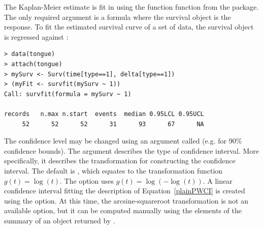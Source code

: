 \documentclass[article]{jss}
\begin{document}
The Kaplan-Meier estimate is fit in  using the function  function from the  package. The only required argument is a formula where the survival object is the response. To fit the estimated survival curve of a set of data, the survival object is regressed against :
\begin{verbatim}
> data(tongue)
> attach(tongue)
> mySurv <- Surv(time[type==1], delta[type==1])
> (myFit <- survfit(mySurv ~ 1))
Call: survfit(formula = mySurv ~ 1)

records   n.max n.start  events  median 0.95LCL 0.95UCL 
     52      52      52      31      93      67      NA 
\end{verbatim}
The confidence level may be changed using an argument called  (e.g.  for 90\% confidence bounds). The  argument describes the type of confidence interval. More specifically, it describes the transformation for constructing the confidence interval. The default is , which equates to the transformation function $g(t) = \log(t)$. The  option uses $g(t) = \log(-\log(t))$. A linear confidence interval fitting the description of Equation~\eqref{plainPWCI} is created using the  option. At this time, the arcsine-squareroot transformation is not an available option, but it can be computed manually using the elements of the summary of an object returned by .




\end{document}
